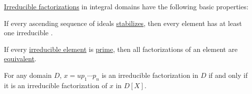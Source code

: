 \begin{proposition}\label{thm:def:irreducible_factorization}
  \hyperref[def:irreducible_factorization]{Irreducible factorizations} in integral domains have the following basic properties:
  \begin{thmenum}
     If every ascending sequence of  ideals \hyperref[def:stabilizing_sequence]{stabilizes}, then every element has at least one irreducible .

     If every \hyperref[def:domain_divisibility/irreducible]{irreducible element} is \hyperref[def:domain_divisibility/prime]{prime}, then all factorizations of an element are \hyperref[def:irreducible_factorization/equivalent]{equivalent}.

     For any domain \( D \), \( x = u p_1 \cdots p_n \) is an irreducible factorization in \( D \) if and only if it is an irreducible factorization of \( x \) in \( D[X] \).
  \end{thmenum}
\end{proposition}
